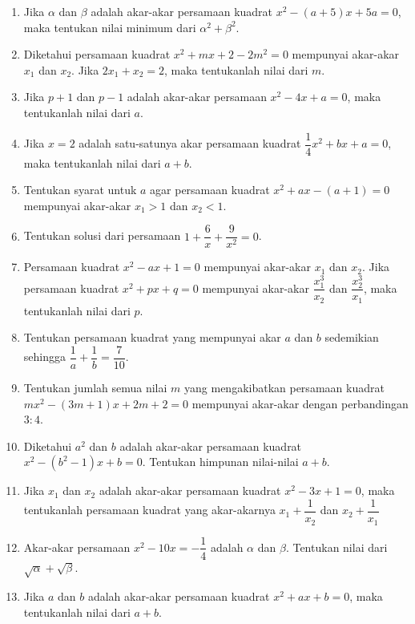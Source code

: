 	\begin{enumerate}[topsep=0pt]
		\item Jika $ \alpha $ dan $ \beta $ adalah akar-akar persamaan kuadrat $ x^{2} - \left(a + 5\right)x + 5a = 0 $, maka tentukan nilai minimum dari $ \alpha^{2} + \beta^{2} $.
		\item Diketahui persamaan kuadrat $ x^{2} + mx + 2 - 2m^{2} = 0 $ mempunyai akar-akar $ x_{1} $ dan $ x_{2} $. Jika $ 2x_{1} + x_{2} = 2 $, maka tentukanlah nilai dari $ m $.
		\item Jika $ p + 1 $ dan $ p - 1 $ adalah akar-akar persamaan $ x^{2} - 4x + a = 0 $, maka tentukanlah nilai dari $ a $.
		\item Jika $ x = 2 $ adalah satu-satunya akar persamaan kuadrat $ \dfrac{1}{4}x^{2} + bx + a = 0 $, maka tentukanlah nilai dari $ a + b $.
		\item Tentukan syarat untuk $ a $ agar persamaan kuadrat $ x^{2} + ax - \left(a + 1\right) = 0 $ mempunyai akar-akar $ x_{1} > 1 $ dan $ x_{2} < 1 $.
		\item Tentukan solusi dari persamaan $ 1 + \dfrac{6}{x} + \dfrac{9}{x^{2}} = 0 $.
		\item Persamaan kuadrat $ x^{2} - ax + 1 = 0 $ mempunyai akar-akar $ x_{1} $ dan $ x_{2} $. Jika persamaan kuadrat $ x^{2} + px + q = 0 $ mempunyai akar-akar $ \dfrac{x_{1}^{3}}{x_{2}} $ dan $ \dfrac{x_{2}^{3}}{x_{1}} $, maka tentukanlah nilai dari $ p $.
		\item Tentukan persamaan kuadrat yang mempunyai akar $ a $ dan $ b $ sedemikian sehingga $ \dfrac{1}{a} + \dfrac{1}{b} = \dfrac{7}{10} $.
		\item Tentukan jumlah semua nilai $ m $ yang mengakibatkan persamaan kuadrat $ mx^{2} - \left(3m + 1\right)x + 2m + 2 = 0 $ mempunyai akar-akar dengan perbandingan $ 3 : 4 $.
		\item Diketahui $ a^{2} $ dan $ b $ adalah akar-akar persamaan kuadrat $ x^{2} - \left(b^{2} - 1\right)x + b = 0 $. Tentukan himpunan nilai-nilai $ a + b $.
		\item Jika $ x_{1} $ dan $ x_{2} $ adalah akar-akar persamaan kuadrat $ x^{2} - 3x + 1 = 0 $, maka tentukanlah persamaan kuadrat yang akar-akarnya $ x_{1} + \dfrac{1}{x_{2}} $ dan $ x_{2} + \dfrac{1}{x_{1}} $
		\item Akar-akar persamaan $ x^{2} - 10x = -\dfrac{1}{4} $ adalah $ \alpha $ dan $ \beta $. Tentukan nilai dari $ \sqrt{\alpha} + \sqrt{\beta} $.
		\item Jika $ a $ dan $ b $ adalah akar-akar persamaan kuadrat $ x^{2} + ax + b = 0 $, maka tentukanlah nilai dari $ a + b $.

\end{enumerate}
